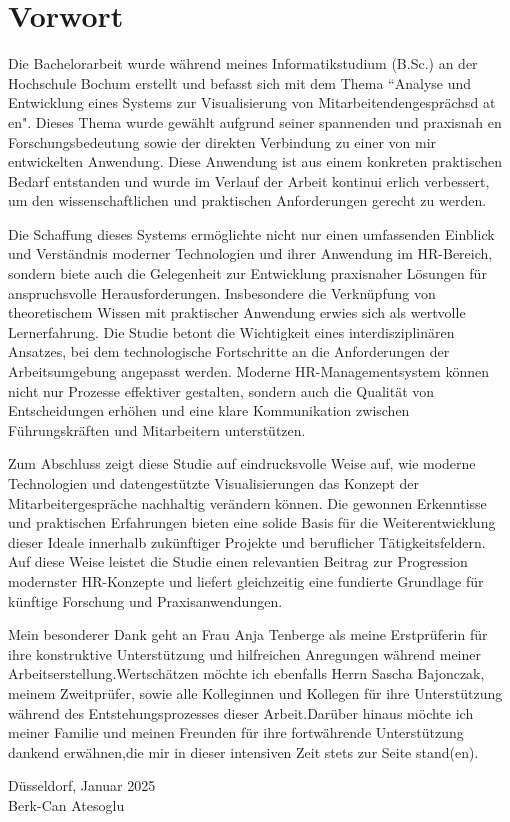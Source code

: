 \chapter*{Vorwort}

 Die Bachelorarbeit wurde während meines Informatikstudium (B.Sc.) an der Hochschule Bochum erstellt und befasst sich mit dem Thema “Analyse und Entwicklung eines Systems zur Visualisierung von Mitarbeitendengesprächsd at en". Dieses Thema wurde gewählt aufgrund seiner spannenden und praxisnah en Forschungsbedeutung sowie der direkten Verbindung zu einer von mir entwickelten Anwendung. Diese Anwendung ist aus einem konkreten praktischen Bedarf entstanden und wurde im Verlauf der Arbeit kontinui erlich verbessert, um den wissenschaftlichen und praktischen Anforderungen gerecht zu werden. 
 
 Die Schaffung dieses Systems ermöglichte nicht nur einen umfassenden Einblick und Verständnis moderner Technologien und ihrer Anwendung im HR-Bereich, sondern biete auch die Gelegenheit zur Entwicklung praxisnaher Lösungen für anspruchsvolle Herausforderungen. Insbesondere die Verknüpfung von theoretischem Wissen mit praktischer Anwendung erwies sich als wertvolle Lernerfahrung. 
Die Studie betont die Wichtigkeit eines interdisziplinären Ansatzes, bei dem technologische Fortschritte an die Anforderungen der Arbeitsumgebung angepasst werden. Moderne HR-Managementsystem können nicht nur Prozesse effektiver gestalten, sondern auch die Qualität von Entscheidungen erhöhen und eine klare Kommunikation zwischen Führungskräften und Mitarbeitern unterstützen.  

Zum Abschluss zeigt diese Studie auf eindrucksvolle Weise auf, wie moderne Technologien und datengestützte Visualisierungen das Konzept der Mitarbeitergespräche nachhaltig verändern können. Die gewonnen Erkenntisse und praktischen Erfahrungen bieten eine solide Basis für die Weiterentwicklung dieser Ideale innerhalb zukünftiger Projekte und beruflicher Tätigkeitsfeldern. Auf diese Weise leistet die Studie einen relevantien Beitrag zur Progression modernster HR-Konzepte und liefert gleichzeitig eine fundierte Grundlage für künftige Forschung und Praxisanwendungen. 

Mein besonderer Dank geht an Frau Anja Tenberge als meine Erstprüferin für ihre konstruktive Unterstützung und hilfreichen Anregungen während meiner Arbeitserstellung.Wertschätzen möchte ich ebenfalls Herrn Sascha Bajonczak, meinem Zweitprüfer, sowie alle Kolleginnen und Kollegen für ihre Unterstützung während des Entstehungsprozesses dieser Arbeit.Darüber hinaus möchte ich meiner Familie und meinen Freunden für ihre fortwährende Unterstützung dankend erwähnen,die mir in dieser intensiven Zeit stets zur Seite stand(en).

\vspace{1cm}

\begin{flushright}
Düsseldorf, Januar 2025 \\
Berk-Can Atesoglu
\end{flushright}
